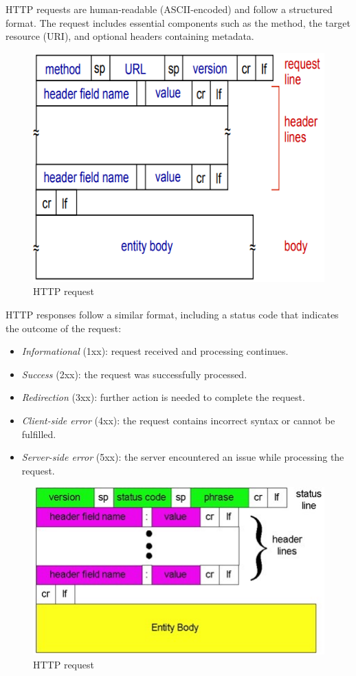 HTTP requests are human-readable (ASCII-encoded) and follow a structured format. 
The request includes essential components such as the method, the target resource (URI), and optional headers containing metadata.
\begin{figure}[H]
    \centering
    \includegraphics[width=0.5\linewidth]{images/http.png}
    \caption{HTTP request}
\end{figure}
HTTP responses follow a similar format, including a status code that indicates the outcome of the request:
\begin{itemize}
    \item \textit{Informational} (1xx): request received and processing continues.
    \item \textit{Success} (2xx): the request was successfully processed.
    \item \textit{Redirection} (3xx): further action is needed to complete the request.
    \item \textit{Client-side error} (4xx): the request contains incorrect syntax or cannot be fulfilled.
    \item \textit{Server-side error} (5xx): the server encountered an issue while processing the request.
\end{itemize}
\begin{figure}[H]
    \centering
    \includegraphics[width=0.5\linewidth]{images/http1.png}
    \caption{HTTP request}
\end{figure}